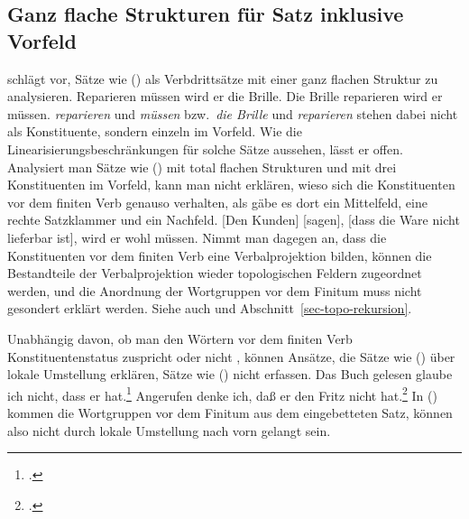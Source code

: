 


\subsection{Ganz flache Strukturen für Satz inklusive Vorfeld}
\label{sec-pvp-vdrei}

\citet[--171]{Gunkel2003b} schlägt vor, Sätze wie () als Verbdrittsätze
mit einer ganz flachen Struktur zu analysieren.
\eal
\ex Reparieren müssen wird er die Brille.
\ex Die Brille reparieren wird er müssen.
\zl 
\emph{reparieren} und \emph{müssen} bzw.\ \emph{die Brille} und \emph{reparieren}
stehen dabei nicht als Konstituente, sondern einzeln im Vorfeld.
Wie die Linearisierungsbeschränkungen
für solche Sätze aussehen, lässt er offen. Analysiert man Sätze wie () mit total
flachen Strukturen und mit drei Konstituenten im Vorfeld, kann man nicht erklären,
wieso sich die Konstituenten vor dem finiten Verb genauso verhalten, als gäbe es dort
ein Mittelfeld, eine rechte Satzklammer und ein Nachfeld.
\ea
{}[Den Kunden] [sagen], [dass die Ware nicht lieferbar ist], wird er wohl müssen.
\z
Nimmt man dagegen an, dass die Konstituenten vor dem finiten Verb eine Verbalprojektion
bilden, können die Bestandteile der Verbalprojektion wieder topologischen Feldern
zugeordnet werden, und die Anordnung der Wortgruppen vor dem Finitum muss nicht gesondert
erklärt werden. Siehe auch  und Abschnitt~\ref{sec-topo-rekursion}.

Unabhängig davon, ob man den Wörtern vor dem finiten Verb Konstituentenstatus
zuspricht \citep{Kathol95a} oder nicht \citep{Gunkel2003b}, können Ansätze,
die Sätze wie () über lokale Umstellung erklären, Sätze wie ()
nicht erfassen.
\eal
\ex Das Buch gelesen glaube ich nicht, dass er hat.\footnote{
  .
}
\ex Angerufen denke ich, daß er den Fritz nicht hat.\footnote{
  .
}
\zl
In () kommen die Wortgruppen vor dem Finitum aus dem eingebetteten Satz,
können also nicht durch lokale Umstellung nach vorn gelangt sein.

